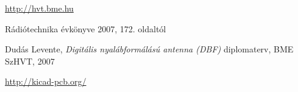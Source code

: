 \begin{thebibliography}{4}

 \url{http://hvt.bme.hu}

 Rádiótechnika évkönyve 2007, 172. oldaltól

 Dudás Levente, \emph{Digitális nyalábformálású antenna (DBF)} diplomaterv, BME SzHVT, 2007

 \url{http://kicad-pcb.org/}

\end{thebibliography}

